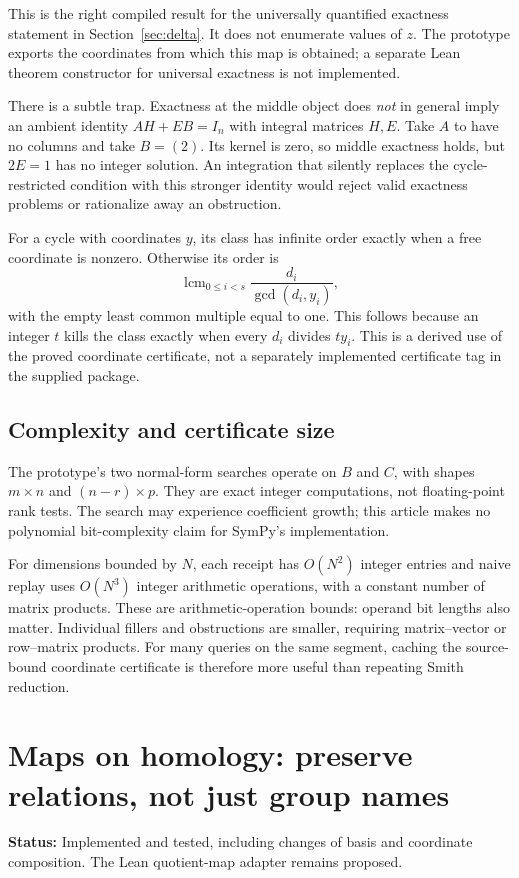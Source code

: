 \documentclass[11pt,letterpaper]{article}
\theoremstyle{definition}\newtheorem{definition}[theorem]{Definition}
\theoremstyle{remark}\newtheorem{remark}[theorem]{Remark}
\newcommand{\status}[1]{\par\smallskip\textsf{\textbf{Status:} #1}\par\smallskip}
\begin{document}
This is the right compiled result for the universally quantified exactness
statement in Section~\ref{sec:delta}. It does not enumerate values of $z$.
The prototype exports the coordinates from which this map is obtained; a
separate Lean theorem constructor for universal exactness is not implemented.

There is a subtle trap. Exactness at the middle object does \emph{not} in general
imply an ambient identity $AH+EB=I_n$ with integral matrices $H,E$. Take $A$ to
have no columns and take $B=(2)$. Its kernel is zero, so middle exactness holds,
but $2E=1$ has no integer solution. An integration that silently replaces the
cycle-restricted condition with this stronger identity would reject valid
exactness problems or rationalize away an obstruction.

For a cycle with coordinates $y$, its class has infinite order exactly when a
free coordinate is nonzero. Otherwise its order is
\[
 \operatorname{lcm}_{0\leq i<s}
 \frac{d_i}{\gcd(d_i,y_i)},
\]
with the empty least common multiple equal to one. This follows because an
integer $t$ kills the class exactly when every $d_i$ divides $ty_i$.
This is a derived use of the proved coordinate certificate, not a separately
implemented certificate tag in the supplied package.

\subsection{Complexity and certificate size}
The prototype's two normal-form searches operate on $B$ and $C$, with shapes
$m\times n$ and $(n-r)\times p$. They are exact integer computations, not
floating-point rank tests. The search may experience coefficient growth;
this article makes no polynomial bit-complexity claim for SymPy's implementation.

For dimensions bounded by $N$, each receipt has $O(N^2)$ integer entries and
naive replay uses $O(N^3)$ integer arithmetic operations, with a constant number
of matrix products. These are arithmetic-operation bounds: operand bit lengths
also matter. Individual fillers and obstructions are smaller, requiring
matrix--vector or row--matrix products. For many queries on the same segment,
caching the source-bound coordinate certificate is therefore more useful than
repeating Smith reduction.

\section{Maps on homology: preserve relations, not just group names}
\label{sec:induced}
\status{Implemented and tested, including changes of basis and coordinate
composition. The Lean quotient-map adapter remains proposed.}
\end{document}
